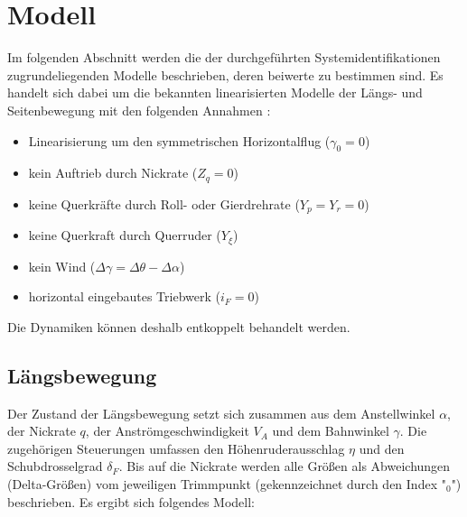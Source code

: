 \chapter{Modell}

Im folgenden Abschnitt werden die der durchgeführten Systemidentifikationen 
zugrundeliegenden Modelle beschrieben, deren beiwerte zu bestimmen sind. Es 
handelt sich dabei um die bekannten linearisierten Modelle der Längs- und 
Seitenbewegung mit den folgenden Annahmen \cite{Fichter2009}:
\begin{itemize}
	\item Linearisierung um den symmetrischen Horizontalflug ($ \gamma_0=0 $)
	\item kein Auftrieb durch Nickrate ($ Z_q=0 $)
	\item keine Querkräfte durch Roll- oder Gierdrehrate ($ Y_p=Y_r=0 $)
	\item keine Querkraft durch Querruder ($ Y_\xi $)
	\item kein Wind ($ \Delta\gamma = \Delta\theta-\Delta\alpha $)
	\item horizontal eingebautes Triebwerk ($ i_F=0 $)
\end{itemize} 
Die Dynamiken können deshalb entkoppelt behandelt werden. %

\section{Längsbewegung}
Der Zustand der Längsbewegung setzt sich zusammen aus dem Anstellwinkel $ 
\alpha $, der Nickrate $ q $, der Anströmgeschwindigkeit $ V_A $ und dem 
Bahnwinkel $ \gamma $. Die zugehörigen Steuerungen umfassen den 
Höhenruderausschlag $ \eta $ und den Schubdrosselgrad $ \delta_F $. Bis auf die 
Nickrate werden alle Größen als Abweichungen (Delta-Größen) vom jeweiligen 
Trimmpunkt 
(gekennzeichnet durch den Index "$ _0 $") beschrieben. Es ergibt sich folgendes 
Modell\cite{Fichter2009}:

